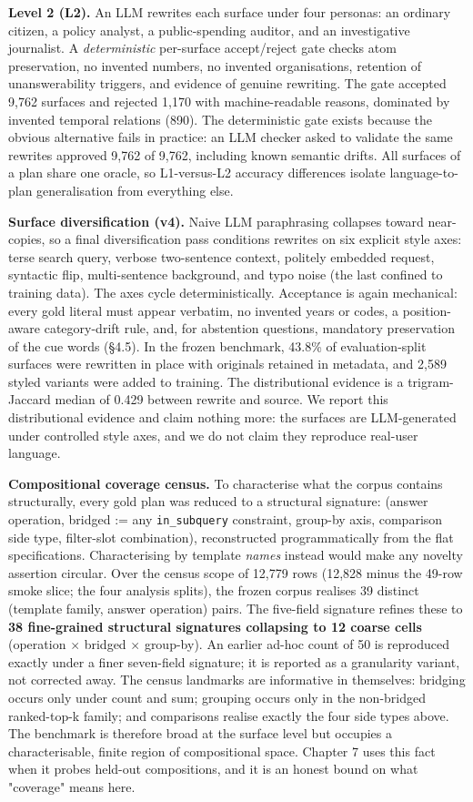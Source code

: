 \textbf{Level 2 (L2).} An LLM rewrites each surface under four personas: an ordinary citizen, a policy analyst, a public-spending auditor, and an investigative journalist. A \emph{deterministic} per-surface accept/reject gate checks atom preservation, no invented numbers, no invented organisations, retention of unanswerability triggers, and evidence of genuine rewriting. The gate accepted 9,762 surfaces and rejected 1,170 with machine-readable reasons, dominated by invented temporal relations (890). The deterministic gate exists because the obvious alternative fails in practice: an LLM checker asked to validate the same rewrites approved 9,762 of 9,762, including known semantic drifts. All surfaces of a plan share one oracle, so L1-versus-L2 accuracy differences isolate language-to-plan generalisation from everything else.

\textbf{Surface diversification (v4).} Naive LLM paraphrasing collapses toward near-copies, so a final diversification pass conditions rewrites on six explicit style axes: terse search query, verbose two-sentence context, politely embedded request, syntactic flip, multi-sentence background, and typo noise (the last confined to training data). The axes cycle deterministically. Acceptance is again mechanical: every gold literal must appear verbatim, no invented years or codes, a position-aware category-drift rule, and, for abstention questions, mandatory preservation of the cue words (§4.5). In the frozen benchmark, 43.8\% of evaluation-split surfaces were rewritten in place with originals retained in metadata, and 2,589 styled variants were added to training. The distributional evidence is a trigram-Jaccard median of 0.429 between rewrite and source. We report this distributional evidence and claim nothing more: the surfaces are LLM-generated under controlled style axes, and we do not claim they reproduce real-user language.

\textbf{Compositional coverage census.} To characterise what the corpus contains structurally, every gold plan was reduced to a structural signature: (answer operation, bridged := any \texttt{in\_subquery} constraint, group-by axis, comparison side type, filter-slot combination), reconstructed programmatically from the flat specifications. Characterising by template \emph{names} instead would make any novelty assertion circular. Over the census scope of 12,779 rows (12,828 minus the 49-row smoke slice; the four analysis splits), the frozen corpus realises 39 distinct (template family, answer operation) pairs. The five-field signature refines these to \textbf{38 fine-grained structural signatures collapsing to 12 coarse cells} (operation $\times$ bridged $\times$ group-by). An earlier ad-hoc count of 50 is reproduced exactly under a finer seven-field signature; it is reported as a granularity variant, not corrected away. The census landmarks are informative in themselves: bridging occurs only under count and sum; grouping occurs only in the non-bridged ranked-top-k family; and comparisons realise exactly the four side types above. The benchmark is therefore broad at the surface level but occupies a characterisable, finite region of compositional space. Chapter 7 uses this fact when it probes held-out compositions, and it is an honest bound on what "coverage" means here.

